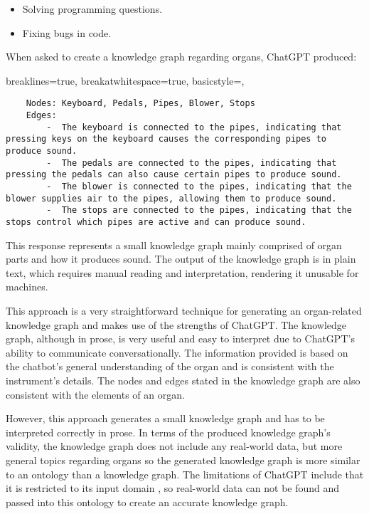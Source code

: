 \vspace{-0.15cm}
\begin{itemize}
    \itemsep0em 
\item Solving programming questions.
\vspace{-0.1cm}
\item Fixing bugs in code.
\end{itemize}
\vspace{-0.15cm}

\noindent When asked to create a knowledge graph regarding organs, ChatGPT produced:

\lstset
{
    breaklines=true,
    breakatwhitespace=true,
    basicstyle=\linespread{1.5}\ttfamily,
}
\begin{lstlisting}
    Nodes: Keyboard, Pedals, Pipes, Blower, Stops
    Edges:
        -  The keyboard is connected to the pipes, indicating that pressing keys on the keyboard causes the corresponding pipes to produce sound.
        -  The pedals are connected to the pipes, indicating that pressing the pedals can also cause certain pipes to produce sound.
        -  The blower is connected to the pipes, indicating that the blower supplies air to the pipes, allowing them to produce sound.
        -  The stops are connected to the pipes, indicating that the stops control which pipes are active and can produce sound.
\end{lstlisting}

This response represents a small knowledge graph mainly comprised of organ parts and how it produces sound. The output of the knowledge graph is in plain text, which requires manual reading and interpretation, rendering it unusable for machines.

This approach is a very straightforward technique for generating an organ-related knowledge graph and makes use of the strengths of ChatGPT. The knowledge graph, although in prose, is very useful and easy to interpret due to ChatGPT's ability to communicate conversationally. The information provided is based on the chatbot's general understanding of the organ and is consistent with the instrument's details. The nodes and edges stated in the knowledge graph are also consistent with the elements of an organ. 

However, this approach generates a small knowledge graph and has to be interpreted correctly in prose. In terms of the produced knowledge graph's validity, the knowledge graph does not include any real-world data, but more general topics regarding organs so the generated knowledge graph is more similar to an ontology than a knowledge graph. The limitations of ChatGPT include that it is restricted to its input domain \cite{chatgptwebsite}, so real-world data can not be found and passed into this ontology to create an accurate knowledge graph. 

